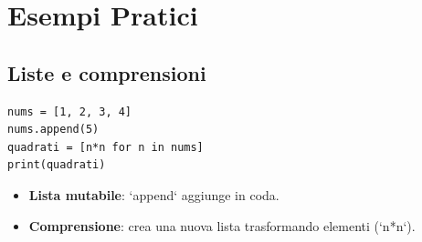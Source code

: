 \section{Esempi Pratici}
\subsection{Liste e comprensioni}
\begin{lstlisting}
nums = [1, 2, 3, 4]
nums.append(5)
quadrati = [n*n for n in nums]
print(quadrati)
\end{lstlisting}
\begin{tcolorbox}[title=Spiegazione del codice]
\begin{itemize}
  \item \textbf{Lista mutabile}: `append` aggiunge in coda.
  \item \textbf{Comprensione}: crea una nuova lista trasformando elementi (`n*n`).
\end{itemize}
\end{tcolorbox}

